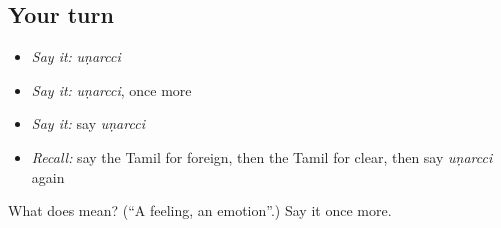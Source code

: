 \subsection*{Your turn}
\begin{itemize}
\raggedright
  \item \emph{Say it:} \emph{uṇarcci}
  \item \emph{Say it:} \emph{uṇarcci}, once more
  \item \emph{Say it:} say \emph{uṇarcci}
  \item \emph{Recall:} say the Tamil for foreign, then the Tamil for clear, then say \emph{uṇarcci} again
\end{itemize}

\begin{tcolorbox}[breakable,colback=teal!4,colframe=teal!35!black,title={Before you move on}]
What does  mean? (\textquotedblleft{}A feeling, an emotion\textquotedblright{}.) Say it once more.
\end{tcolorbox}

